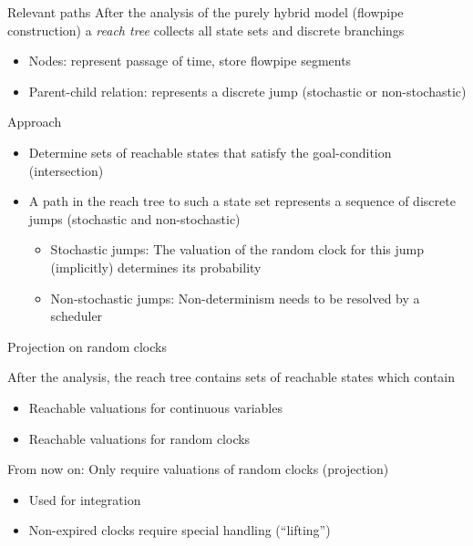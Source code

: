 \documentclass[aspectratio=169]{beamer}
\newcommand{\cb}[1]{\textcolor{blue100}{#1}\xspace}
\begin{document}
\begin{frame}{Relevant paths}
After the analysis of the purely hybrid model (flowpipe construction) a \emph{reach tree} collects all state sets and discrete branchings
\begin{itemize}
  \item Nodes: represent passage of time, store flowpipe segments
  \item Parent-child relation: represents a discrete jump (stochastic or non-stochastic)
\end{itemize}

\bigskip

\cb{Approach}
\begin{itemize}
  \item Determine sets of reachable states that satisfy the goal-condition (intersection)
  \item A path in the reach tree to such a state set represents a sequence of discrete jumps (stochastic and non-stochastic)
  \begin{itemize}
    \item Stochastic jumps: The valuation of the random clock for this jump (implicitly) determines its probability
    \item Non-stochastic jumps: Non-determinism needs to be resolved by a scheduler
  \end{itemize}
\end{itemize}





\end{frame}


\begin{frame}{Projection on random clocks}

  After the analysis, the reach tree contains sets of reachable states which contain
  \begin{itemize}
    \item Reachable valuations for continuous variables
    \item Reachable valuations for random clocks
  \end{itemize}

  \medskip

  From now on: Only require valuations of random clocks (projection)
  \begin{itemize}
    \item Used for integration
    \item Non-expired clocks require special handling (\enquote{lifting})
  \end{itemize}

  \bigskip

  \centering
  

\end{frame}
\end{document}
